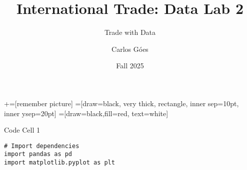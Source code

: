 \documentclass[notes,11pt, aspectratio=169, xcolor=table]{beamer}
\title[]{International Trade: Data Lab 2}
\subtitle[]{Trade with Data}
\author[Góes]
{Carlos Góes\inst{1}}
\date{Fall 2025}
\institute[GWU]{\inst{1} George Washington University }
\begin{document}
\newcommand\marktopleft[1]{%
    \tikz[overlay,remember picture] 
        \node (marker-#1-a) at (-.3em,.3em) {};%
}
\newcommand\markbottomright[2]{%
    \tikz[overlay,remember picture] 
        \node (marker-#1-b) at (0em,0em) {};%
}
+=[remember picture] 
 =[draw=black, very thick, rectangle, inner sep=10pt, inner ysep=20pt]
 =[draw=black,fill=red, text=white]















\frame{\titlepage}
\addtocounter{framenumber}{-1}




\begin{frame}[fragile]{Code Cell 1}
\begin{verbatim}
# Import dependencies
import pandas as pd
import matplotlib.pyplot as plt
\end{verbatim}

\end{frame}
\end{document}
